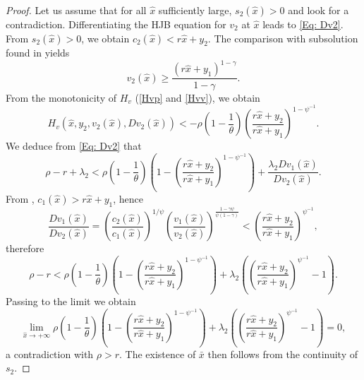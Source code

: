 \documentclass[11pt]{article}
\numberwithin{equation}{section}
\theoremstyle{definition}
\newcommand{\g}{\gamma}
\newcommand{\p}{\psi}
\newcommand{\hx}{\hat{x}}
\newcommand{\lc}{\left(}
\newcommand{\rc}{\right)}
\theoremstyle{plain}
\begin{document}
\begin{proof}
Let us assume that for all $\hx$ sufficiently large, $s_2(\hx)>0$ and look for a contradiction. Differentiating the HJB equation for $v_2$ at $\hx$ leads to \eqref{Eq: Dv2}. From $s_2(\hx)>0$, we obtain $c_2(\hx)<r\hx+y_2$. The comparison with subsolution found in  yields  
$$
v_2(\hx)\geq \frac{(r\hx+y_1)^{1-\gamma}}{1-\gamma}.
$$ 
From the monotonicity of $H_v$ (\eqref{Hvp} and \eqref{Hvv}), we obtain
$$
H_v(\hx,y_2,v_2(\hx),Dv_2(\hx))<-\rho \lc 1-\frac{1}{\theta}\rc \lc \frac{r\hx+y_2}{r\hx+y_1}\rc^{1-\p^{-1}}.
$$
We deduce from \eqref{Eq: Dv2} that
$$
\rho-r+\lambda_2<\rho \lc 1-\frac{1}{\theta}\rc\lc 1- \lc \frac{r\hx+y_2}{r\hx+y_1}\rc^{1-\p^{-1}}\rc+\frac{\lambda_2Dv_1(\hx)}{Dv_2(\hx)}.
$$
From , $c_1(\hx)>r\hx+y_1$, hence 
$$
\frac{Dv_1(\hx)}{Dv_2(\hx)}=\lc \frac{c_2(\hx)}{c_1(\hx)}\rc^{1/\p}\lc \frac{v_1(\hx)}{v_2(\hx)}\rc^{\frac{1-\g \p}{\p(1-\g)}}<\lc \frac{r\hx+y_2}{r\hx+y_1}\rc^{\p^{-1}},
$$
therefore
$$
\rho-r<\rho \lc 1-\frac{1}{\theta}\rc\lc 1- \lc \frac{r\hx+y_2}{r\hx+y_1}\rc^{1-\p^{-1}}\rc+\lambda_2 \lc \lc \frac{r\hx+y_2}{r\hx+y_1}\rc^{\p^{-1}}-1\rc.
$$
{
Passing to the limit we obtain
$$
\lim_{\hx\to +\infty}\rho \lc 1-\frac{1}{\theta}\rc\lc 1- \lc \frac{r\hx+y_2}{r\hx+y_1}\rc^{1-\p^{-1}}\rc+\lambda_2 \lc \lc \frac{r\hx+y_2}{r\hx+y_1}\rc^{\p^{-1}}-1\rc=0,
$$
a contradiction with $\rho>r$.} The existence of $\bar{x}$ then follows from the continuity of $s_2$. 
\end{proof}
\end{document}
